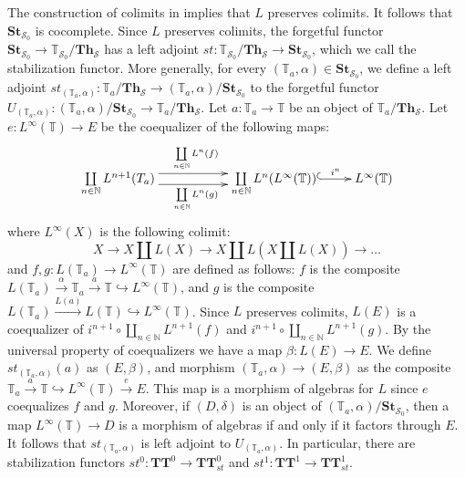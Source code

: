 \documentclass[reqno]{amsart}
\theoremstyle{definition}
\theoremstyle{remark}
\newcommand{\cat}[1]{\mathbf{#1}}
\newcommand{\algtt}{\cat{TT}}
\newcommand{\Th}{\cat{Th}}
\newcommand{\St}{\cat{St}}
\numberwithin{figure}{section}
\begin{document}
The construction of colimits in  implies that $L$ preserves colimits.
It follows that $\St_{\mathcal{S}_0}$ is cocomplete.
Since $L$ preserves colimits, the forgetful functor $\St_{\mathcal{S}_0} \to \mathbb{T}_{\mathcal{S}_0}/\Th_\mathcal{S}$
has a left adjoint $st : \mathbb{T}_{\mathcal{S}_0}/\Th_\mathcal{S} \to \St_{\mathcal{S}_0}$, which we call the stabilization functor.
More generally, for every $(\mathbb{T}_a,\alpha) \in \St_{\mathcal{S}_0}$, we define a left adjoint $st_{(\mathbb{T}_a,\alpha)} : \mathbb{T}_a/\Th_{\mathcal{S}} \to (\mathbb{T}_a,\alpha)/\St_{\mathcal{S}_0}$
to the forgetful functor $U_{(\mathbb{T}_a,\alpha)} : (\mathbb{T}_a,\alpha)/\St_{\mathcal{S}_0} \to \mathbb{T}_a/\Th_{\mathcal{S}}$.
Let $a : \mathbb{T}_a \to \mathbb{T}$ be an object of $\mathbb{T}_a/\Th_{\mathcal{S}}$.
Let $e : L^\infty(\mathbb{T}) \to E$ be the coequalizer of the following maps:
\[ \xymatrix{ \coprod\limits_{n \in \mathbb{N}} L^{n+1}(T_a) \ar@<+1ex>[rr]^{\coprod\limits_{n \in \mathbb{N}} L^n(f)} \ar@<-1ex>[rr]_{\coprod\limits_{n \in \mathbb{N}} L^n(g)}
    & & \coprod\limits_{n \in \mathbb{N}} L^n(L^\infty(\mathbb{T})) \ar@{^{(}->}[r]^-{i^n} & L^\infty(\mathbb{T}) } \]
where $L^\infty(X)$ is the following colimit:
\[ X \to X \amalg L(X) \to X \amalg L(X \amalg L(X)) \to \ldots \]
and $f,g : L(\mathbb{T}_a) \to L^\infty(\mathbb{T})$ are defined as follows: $f$ is the composite $L(\mathbb{T}_a) \xrightarrow{\alpha} \mathbb{T}_a \xrightarrow{a} \mathbb{T} \hookrightarrow L^\infty(\mathbb{T})$,
and $g$ is the composite $L(\mathbb{T}_a) \xrightarrow{L(a)} L(\mathbb{T}) \hookrightarrow L^\infty(\mathbb{T})$.
Since $L$ preserves colimits, $L(E)$ is a coequalizer of $i^{n+1} \circ \coprod_{n \in \mathbb{N}} L^{n+1}(f)$ and $i^{n+1} \circ \coprod_{n \in \mathbb{N}} L^{n+1}(g)$.
By the universal property of coequalizers we have a map $\beta : L(E) \to E$.
We define $st_{(\mathbb{T}_a,\alpha)}(a)$ as $(E,\beta)$, and morphism $(\mathbb{T}_a,\alpha) \to (E,\beta)$ as the composite $\mathbb{T}_a \xrightarrow{a} \mathbb{T} \hookrightarrow L^\infty(\mathbb{T}) \xrightarrow{e} E$.
This map is a morphism of algebras for $L$ since $e$ coequalizes $f$ and $g$.
Moreover, if $(D,\delta)$ is an object of $(\mathbb{T}_a,\alpha)/\St_{\mathcal{S}_0} $,
then a map $L^\infty(\mathbb{T}) \to D$ is a morphism of algebras if and only if it factors through $E$.
It follows that $st_{(\mathbb{T}_a,\alpha)}$ is left adjoint to $U_{(\mathbb{T}_a,\alpha)}$.
In particular, there are stabilization functors $st^0 : \algtt^0 \to \algtt^0_{st}$ and $st^1 : \algtt^1 \to \algtt^1_{st}$.
\end{document}
